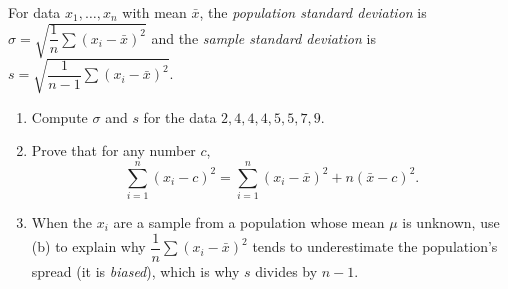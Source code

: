 For data $x_1,\dots,x_n$ with mean $\bar x$, the \emph{population standard deviation} is $\sigma=\sqrt{\dfrac{1}{n}\sum(x_i-\bar x)^2}$ and the \emph{sample standard deviation} is $s=\sqrt{\dfrac{1}{n-1}\sum(x_i-\bar x)^2}$.
\begin{enumerate}
\item[(a)] Compute $\sigma$ and $s$ for the data $2,4,4,4,5,5,7,9$.
\item[(b)] Prove that for any number $c$,
\[
\sum_{i=1}^{n}(x_i-c)^2=\sum_{i=1}^{n}(x_i-\bar x)^2+n(\bar x-c)^2 .
\]
\item[(c)] When the $x_i$ are a sample from a population whose mean $\mu$ is unknown, use (b) to explain why $\dfrac{1}{n}\sum(x_i-\bar x)^2$ tends to underestimate the population's spread (it is \emph{biased}), which is why $s$ divides by $n-1$.
\end{enumerate}
